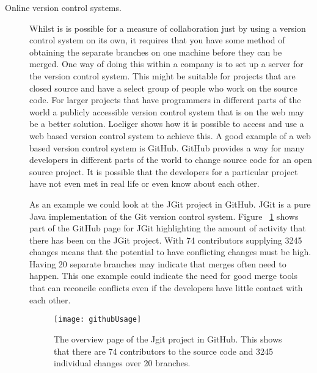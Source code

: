\begin{description}
  \item [Online version control systems.]  
  Whilst is is possible for a measure of collaboration just by using a version control system on its own, it requires that you have some method of obtaining the separate branches on one machine before they can be merged.
  One way of doing this within a company is to set up a server for the version control system.
  This might be suitable for projects that are closed source and have a select group of people who work on the source code.
  For larger projects that have programmers in different parts of the world a publicly accessible version control system that is on the web may be a better solution.
  Loeliger \cite{Loeliger2006} shows how it is possible to access and use a web based version control system to achieve this.
  A good example of a web based version control system is GitHub.
  GitHub provides a way for many developers in different parts of the world to change source code for an open source project.
  It is possible that the developers for a particular project have not even met in real life or even know about each other.

  As an example we could look at the JGit project in GitHub.
  JGit is a pure Java implementation of the Git version control system.
  Figure ~\ref{fig:bgUsage} shows part of the GitHub page for JGit highlighting the amount of activity that there has been on the JGit project.
  With 74 contributors supplying 3245 changes means that the potential to have conflicting changes must be high. Having 20 separate branches may indicate that merges often need to happen. This one example could indicate the need for good merge tools that can reconcile conflicts even if the developers have little contact with each other.

  \begin{figure}[!t]
   \begin{center}
    \texttt{[image: githubUsage]}
   \end{center}
   \caption{The overview page of the Jgit project in GitHub. This shows that there are 74 contributors to the source code and 3245 individual changes over 20 branches.}
   \label{fig:bgUsage}
  \end{figure}


  
\end{description}

